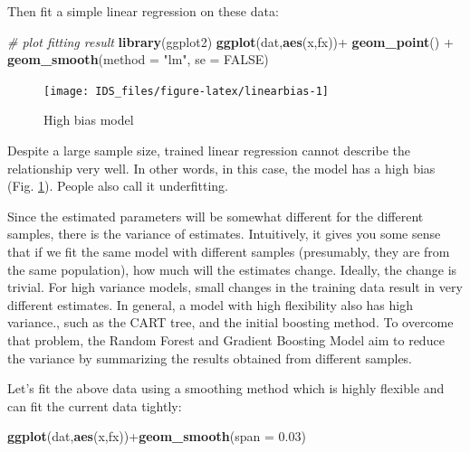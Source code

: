 \documentclass[12pt,]{krantz}
\newenvironment{Shaded}{\begin{snugshade}}{\end{snugshade}}
\newcommand{\KeywordTok}[1]{\textcolor[rgb]{0.13,0.29,0.53}{\textbf{{#1}}}}
\newcommand{\DataTypeTok}[1]{\textcolor[rgb]{0.13,0.29,0.53}{{#1}}}
\newcommand{\FloatTok}[1]{\textcolor[rgb]{0.00,0.00,0.81}{{#1}}}
\newcommand{\StringTok}[1]{\textcolor[rgb]{0.31,0.60,0.02}{{#1}}}
\newcommand{\CommentTok}[1]{\textcolor[rgb]{0.56,0.35,0.01}{\textit{{#1}}}}
\newcommand{\OtherTok}[1]{\textcolor[rgb]{0.56,0.35,0.01}{{#1}}}
\newcommand{\NormalTok}[1]{{#1}}
\theoremstyle{definition}
\theoremstyle{definition}
\theoremstyle{remark}
\begin{document}
Then fit a simple linear regression on these data:

\begin{Shaded}
\begin{Highlighting}[]
\CommentTok{# plot fitting result}
\KeywordTok{library}\NormalTok{(ggplot2)}
\KeywordTok{ggplot}\NormalTok{(dat,}\KeywordTok{aes}\NormalTok{(x,fx))+}\StringTok{ }
\StringTok{  }\KeywordTok{geom_point}\NormalTok{() +}
\StringTok{  }\KeywordTok{geom_smooth}\NormalTok{(}\DataTypeTok{method =} \StringTok{"lm"}\NormalTok{, }\DataTypeTok{se =} \OtherTok{FALSE}\NormalTok{)}
\end{Highlighting}
\end{Shaded}

\begin{figure}

{\centering \texttt{[image: IDS\_files/figure-latex/linearbias-1]} 

}

\caption{High bias model}\label{fig:linearbias}
\end{figure}

Despite a large sample size, trained linear regression cannot describe
the relationship very well. In other words, in this case, the model has
a high bias (Fig. \ref{fig:linearbias}). People also call it
underfitting.

Since the estimated parameters will be somewhat different for the
different samples, there is the variance of estimates. Intuitively, it
gives you some sense that if we fit the same model with different
samples (presumably, they are from the same population), how much will
the estimates change. Ideally, the change is trivial. For high variance
models, small changes in the training data result in very different
estimates. In general, a model with high flexibility also has high
variance., such as the CART tree, and the initial boosting method. To
overcome that problem, the Random Forest and Gradient Boosting Model aim
to reduce the variance by summarizing the results obtained from
different samples.

Let's fit the above data using a smoothing method which is highly
flexible and can fit the current data tightly:

\begin{Shaded}
\begin{Highlighting}[]
\KeywordTok{ggplot}\NormalTok{(dat,}\KeywordTok{aes}\NormalTok{(x,fx))+}\KeywordTok{geom_smooth}\NormalTok{(}\DataTypeTok{span =} \FloatTok{0.03}\NormalTok{)}
\end{Highlighting}
\end{Shaded}
\end{document}
